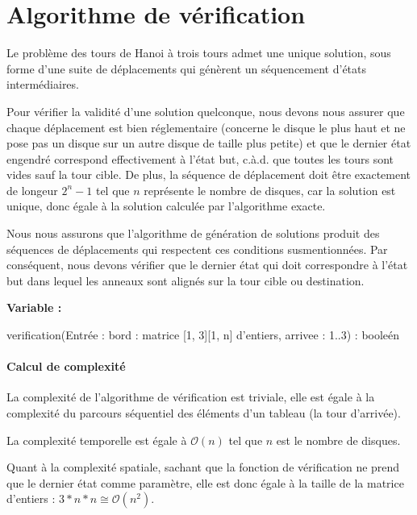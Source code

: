 \section{Algorithme de vérification}
Le problème des tours de Hanoi à trois tours admet une unique solution, sous forme d'une suite de déplacements qui génèrent un séquencement d'états intermédiaires.
\par
Pour vérifier la validité d'une solution quelconque, nous devons nous assurer que chaque déplacement est bien réglementaire (concerne le disque le plus haut et ne pose pas un disque sur un autre disque de taille plus petite) et que le dernier état engendré correspond effectivement à l'état but, c.à.d. que toutes les tours sont vides sauf la tour cible. De plus, la séquence de déplacement doit être exactement de longeur $2^{n} - 1$ tel que $n$ représente le nombre de disques, car la solution est unique, donc égale à la solution calculée par l'algorithme exacte.
\par
Nous nous assurons que l'algorithme de génération de solutions produit des séquences de déplacements qui respectent ces conditions susmentionnées. Par conséquent, nous devons vérifier que le dernier état qui doit correspondre à l'état but dans lequel les anneaux sont alignés sur la tour cible ou destination.

\begin{function}[H]
    \textbf{Variable :}\\
    \caption{verification(Entrée : bord : matrice {[1, 3]}{[1, n]} d'entiers, arrivee : 1..3) : booleén}
\end{function}

\paragraph{Calcul de complexité}
La complexité de l'algorithme de vérification est triviale, elle est égale à la complexité du parcours séquentiel des éléments d'un tableau (la tour d'arrivée).
\par
La complexité temporelle est égale à $\mathcal{O}(n)$ tel que $n$ est le nombre de disques.
\par
Quant à la complexité spatiale, sachant que la fonction de vérification ne prend que le dernier état comme paramètre, elle est donc égale à la taille de la matrice d'entiers : $3 * n * n \cong \mathcal{O}(n^{2})$.

